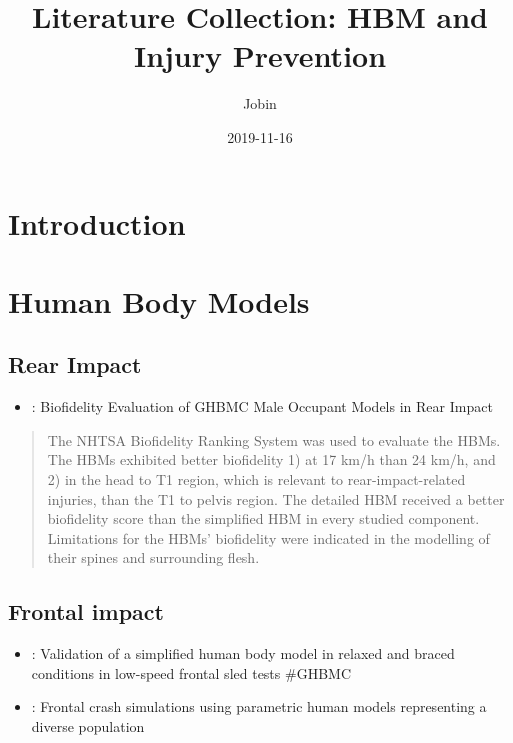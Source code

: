 \documentclass[]{book}
\title{Literature Collection: HBM and Injury Prevention}
\author{Jobin}
\date{2019-11-16}
\providecommand{\tightlist}{%
  \setlength{\itemsep}{0pt}\setlength{\parskip}{0pt}}
\begin{document}
\maketitle

{
\setcounter{tocdepth}{1}
\tableofcontents
}
\hypertarget{introduction}{%
\chapter{Introduction}\label{introduction}}

\hypertarget{human-body-models}{%
\chapter{Human Body Models}\label{human-body-models}}

\hypertarget{rear-impact}{%
\section{Rear Impact}\label{rear-impact}}

\begin{itemize}
\tightlist
\item
  \citet{Katagiri2019}: Biofidelity Evaluation of GHBMC Male Occupant Models in Rear Impact
\end{itemize}

\begin{quote}
The NHTSA Biofidelity Ranking System was used to evaluate the HBMs. The HBMs exhibited better biofidelity 1) at 17 km/h than 24 km/h, and 2) in the head to T1 region, which is relevant to rear-impact-related injuries, than the T1 to pelvis region. The detailed HBM received a better biofidelity score than the simplified HBM in every studied component. Limitations for the HBMs' biofidelity were indicated in the modelling of their spines and surrounding flesh.
\end{quote}

\hypertarget{frontal-impact}{%
\section{Frontal impact}\label{frontal-impact}}

\begin{itemize}
\item
  \citet{Devane2019}: Validation of a simplified human body model in relaxed and braced conditions in low-speed frontal sled tests
  \#GHBMC
\item
  \citet{Hu2019}: Frontal crash simulations using parametric human models representing a diverse population
\end{itemize}
\end{document}
